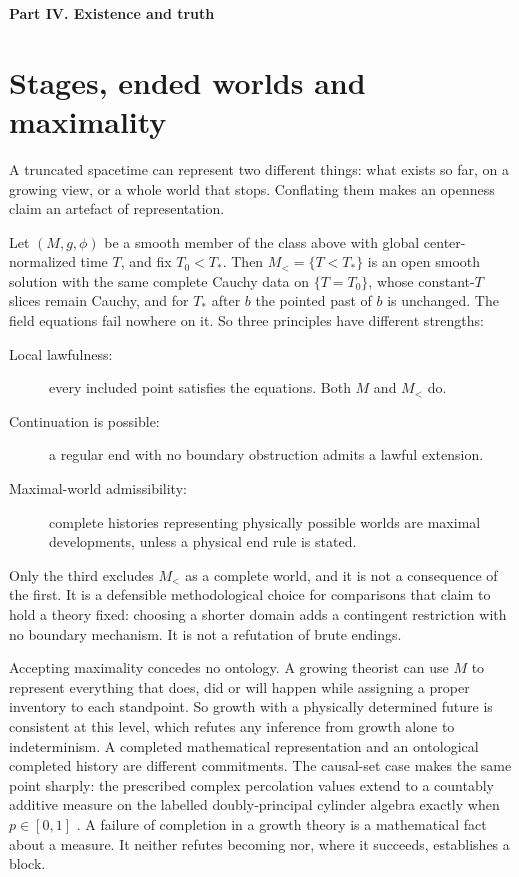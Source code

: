 \documentclass[11pt]{article}
\theoremstyle{definition}
\newcommand{\partheading}[1]{\bigskip\begin{center}\large\bfseries #1\end{center}\addcontentsline{toc}{section}{#1}}
\begin{document}
\partheading{Part IV. Existence and truth}

\section{Stages, ended worlds and maximality}\label{sec:maximal}

A truncated spacetime can represent two different things: what exists so far, on a growing view, or a
whole world that stops. Conflating them makes an openness claim an artefact of representation.

Let $(M,g,\phi)$ be a smooth member of the class above with global center-normalized time $T$, and fix
$T_0<T_*$. Then $M_<=\{T<T_*\}$ is an open smooth solution with the same complete Cauchy data on $\{T=T_0\}$,
whose constant-$T$ slices remain Cauchy, and for $T_*$ after $b$ the pointed past of $b$ is unchanged. The
field equations fail nowhere on it. So three principles have different strengths:
\begin{description}
\item[Local lawfulness:] every included point satisfies the equations. Both $M$ and $M_<$ do.
\item[Continuation is possible:] a regular end with no boundary obstruction admits a lawful extension.
\item[Maximal-world admissibility:] complete histories representing physically possible worlds are maximal
developments, unless a physical end rule is stated.
\end{description}
Only the third excludes $M_<$ as a complete world, and it is not a consequence of the first. It is a
defensible methodological choice for comparisons that claim to hold a theory fixed: choosing a shorter
domain adds a contingent restriction with no boundary mechanism. It is not a refutation of brute endings.

Accepting maximality concedes no ontology. A growing theorist can use $M$ to represent everything that
does, did or will happen while assigning a proper inventory to each standpoint. So growth with a physically
determined future is consistent at this level, which refutes any inference from growth alone to
indeterminism. A completed mathematical representation and an ontological completed history are different
commitments. The causal-set case makes the same point sharply: the prescribed complex percolation values
extend to a countably additive measure on the labelled doubly-principal cylinder algebra exactly when
$p\in[0,1]$ \citep{ProjectPercolation}. A failure of completion in a growth theory is a mathematical fact about a
measure. It neither refutes becoming nor, where it succeeds, establishes a block.
\end{document}
